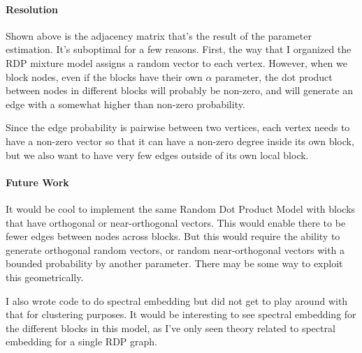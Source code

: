 \documentclass[12pt]{article}
\begin{document}
\paragraph{Resolution}
Shown above is the adjacency matrix that's the result of the parameter
estimation.  It's suboptimal for a few reasons.  First, the way that I organized
the RDP mixture model assigns a random vector to each vertex.  However, when we
block nodes, even if the blocks have their own $\alpha$ parameter, the dot
product between nodes in different blocks will probably be non-zero, and will
generate an edge with a somewhat higher than non-zero probability.

Since the edge probability is pairwise between two vertices, each vertex needs
to have a non-zero vector so that it can have a non-zero degree inside its own
block, but we also want to have very few edges outside of its own local block.

\paragraph{Future Work}
It would be cool to implement the same Random Dot Product Model with blocks that
have orthogonal or near-orthogonal vectors.  This would enable there to be fewer
edges between nodes across blocks.  But this would require the ability to
generate orthogonal random vectors, or random near-orthogonal vectors with a
bounded probability by another parameter.  There may be some way to exploit this
geometrically.

I also wrote code to do spectral embedding but did not get to play around with
that for clustering purposes.  It would be interesting to see spectral
embedding for the different blocks in this model, as I've only seen theory
related to spectral embedding for a single RDP graph.
\newpage



\end{document}
